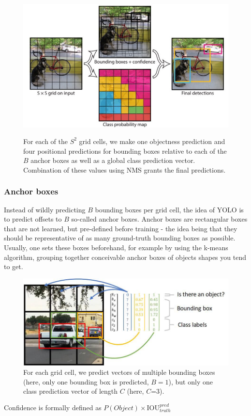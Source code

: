 \documentclass[a4paper]{article}
\begin{document}
\begin{figure}
\includegraphics[scale=0.35]{images/yolo_model}\label{fig:yolomodel}
\caption{For each of the $S^2$ grid cells, we make one objectness prediction and four positional predictions for bounding boxes relative to each of the $B$ anchor boxes as well as a global class prediction vector. Combination of these values using NMS grants the final predictions.}
\end{figure}


\subsubsection*{Anchor boxes}
Instead of wildly predicting $B$ bounding boxes per grid cell, the idea of YOLO is to predict offsets to $B$ so-called anchor boxes. Anchor boxes are rectangular boxes that are not learned, but pre-defined before training - the idea being that they should be representative of as many ground-truth bounding boxes as possible. \\
Usually, one sets these boxes beforehand, for example by using the k-means algorithm, grouping together conceivable anchor boxes of objects shapes you tend to get. 
\begin{figure}
\includegraphics[scale=0.35]{images/yolo_mechanics}
\caption{For each grid cell, we predict vectors of multiple bounding boxes (here, only one bounding box is predicted, $B=1$), but only one class prediction vector of length $C$ (here, $C$=3).}
\label{fig:cell}
\end{figure}
Confidence is formally defined as $P(Object) \times \text{IOU}^{pred}_{truth}$
\end{document}
